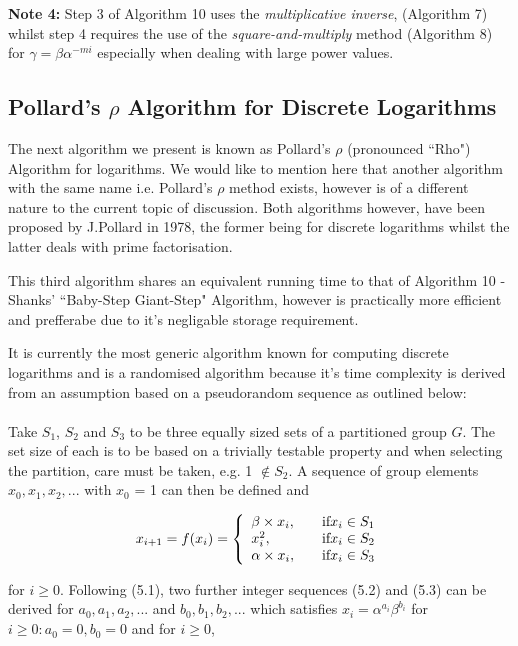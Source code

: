 \documentclass[iwp,first]{luthesis}
\begin{document}
\textbf{Note 4:} Step 3 of Algorithm 10 uses the \textit{multiplicative inverse}, (Algorithm 7) whilst step 4 requires the use of the \textit{square-and-multiply} method (Algorithm 8) for $\gamma = \beta\alpha^{-mi}$ especially when dealing with large power values.

\subsection{Pollard's $\rho$ Algorithm for Discrete Logarithms}

The next algorithm we present is known as Pollard's $\rho$ (pronounced ``Rho") Algorithm for logarithms.
We would like to mention here that another algorithm with the same name i.e. Pollard's $\rho$ method exists, however is of a different nature to the current topic of discussion. Both algorithms however, have been proposed by J.Pollard in 1978, the former being for discrete logarithms whilst the latter deals with prime factorisation.

This third algorithm shares an equivalent running time to that of Algorithm 10 - Shanks' ``Baby-Step Giant-Step" Algorithm, however is practically more efficient and prefferabe due to it's negligable storage requirement. 

It is currently the most generic algorithm known for computing discrete logarithms and is a randomised algorithm because it's time complexity is derived from an assumption based on a pseudorandom sequence as outlined below:
\\
\\
Take $S_1$, $S_2$ and $S_3$ to be three equally sized sets of a partitioned group $G$. The set size of each is to be based on a trivially testable property and when selecting the partition, care must be taken, e.g. 1 $\notin S_2$. A sequence of group elements $x_0, x_1, x_2,...$ with $x_0$ = 1 can then be defined and

\begin{equation}\label{}
x_{i+1}= f(x_i) = \left\{
\begin{array}{l l l}
	\beta \times x_i, & \quad \textrm{if} x_i \in S_1\\
	x_{i}^2, & \quad \textrm{if} x_i \in S_2\\
	\alpha \times x_i, & \quad \textrm{if} x_i \in S_3\\
\end{array} \right.
\end{equation}

for $i \geq 0$. Following (5.1), two further integer sequences (5.2) and (5.3) can be derived for $a_0, a_1, a_2,...$ and $b_0, b_1, b_2,...$ which satisfies $x_i = \alpha^{a_i}\beta^{b_i}$ for $i \geq 0 : a_0 = 0, b_0 = 0$ and for $i \geq 0$,
\end{document}
